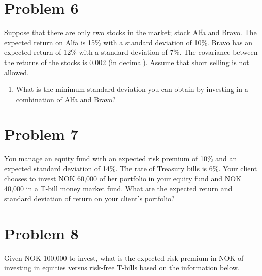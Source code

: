\documentclass[12]{article}
\begin{document}
\section*{Problem 6}
Suppose that there are only two stocks in the market; stock Alfa and Bravo. The expected return on Alfa is 15\% with a standard deviation of 10\%. Bravo has an expected return of 12\% with a standard deviation of 7\%. The covariance between the returns of the stocks is 0.002 (in decimal). Assume that short selling is not allowed.
\begin{enumerate}
    \item[a)] What is the minimum standard deviation you can obtain by investing in a combination of Alfa and Bravo?
\end{enumerate}




\section*{Problem 7}
You manage an equity fund with an expected risk premium of 10\% and an expected standard deviation of 14\%. The rate of Treasury bills is 6\%. Your client chooses to invest NOK 60,000 of her portfolio in your equity fund and NOK 40,000 in a T-bill money market fund. What are the expected return and standard deviation of return on your client's portfolio?



\section*{Problem 8}
Given NOK 100,000 to invest, what is the expected risk premium in NOK of investing in equities versus risk-free T-bills based on the information below.


\begin{table}[H]
\label{tab:my-table}
\end{table}
\end{document}
